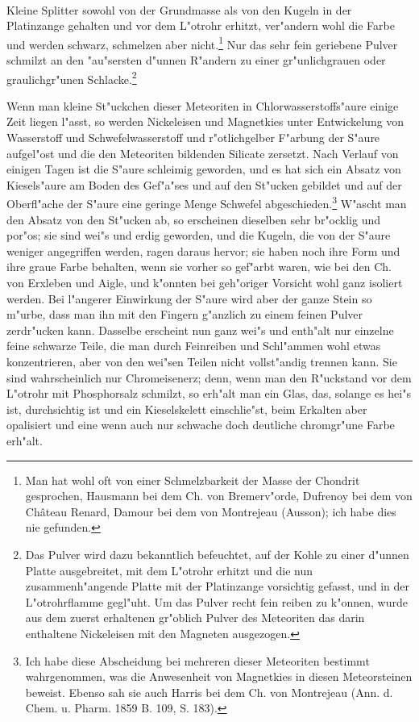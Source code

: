\documentclass[a4paper, 11pt, oneside]{article}
\begin{document}
\paragraph{}
Kleine Splitter sowohl von der Grundmasse als von den Kugeln in der Platinzange gehalten und vor dem L"otrohr erhitzt, ver"andern wohl die Farbe und werden schwarz, schmelzen aber nicht.\footnote{Man hat wohl oft von einer Schmelzbarkeit der Masse der Chondrit gesprochen, Hausmann bei dem Ch. von Bremerv"orde, Dufrenoy bei dem von Château Renard, Damour bei dem von Montrejeau (Ausson); ich habe dies nie gefunden.} Nur das sehr fein geriebene Pulver schmilzt an den "au"sersten d"unnen R"andern zu einer gr"unlichgrauen oder graulichgr"unen Schlacke.\footnote{Das Pulver wird dazu bekanntlich befeuchtet, auf der Kohle zu einer d"unnen Platte ausgebreitet, mit dem L"otrohr erhitzt und die nun zusammenh"angende Platte mit der Platinzange vorsichtig gefasst, und in der L"otrohrflamme gegl"uht. Um das Pulver recht fein reiben zu k"onnen, wurde aus dem zuerst erhaltenen gr"oblich Pulver des Meteoriten das darin enthaltene Nickeleisen mit den Magneten ausgezogen.}

Wenn man kleine St"uckchen dieser Meteoriten in Chlorwasserstoffs"aure einige Zeit liegen l"asst, so werden Nickeleisen und Magnetkies unter Entwickelung von Wasserstoff und Schwefelwasserstoff und r"otlichgelber F"arbung der S"aure aufgel"ost und die den Meteoriten bildenden Silicate zersetzt. Nach Verlauf von einigen Tagen ist die S"aure schleimig geworden, und es hat sich ein Absatz von Kiesels"aure am Boden des Gef"a"ses und auf den St"ucken gebildet und auf der Oberfl"ache der S"aure eine geringe Menge Schwefel abgeschieden.\footnote{Ich habe diese Abscheidung bei mehreren dieser Meteoriten bestimmt wahrgenommen, was die Anwesenheit von Magnetkies in diesen Meteorsteinen beweist. Ebenso sah sie auch Harris bei dem Ch. von Montrejeau (Ann. d. Chem. u. Pharm. 1859 B. 109, S. 183).} W"ascht man den Absatz von den St"ucken ab, so erscheinen dieselben sehr br"ocklig und por"os; sie sind wei"s und erdig geworden, und die Kugeln, die von der S"aure weniger angegriffen werden, ragen daraus hervor; sie haben noch ihre Form und ihre graue Farbe behalten, wenn sie vorher so gef"arbt waren, wie bei den Ch. von Erxleben und Aigle, und k"onnten bei geh"origer Vorsicht wohl ganz isoliert werden. Bei l"angerer Einwirkung der S"aure wird aber der ganze Stein so m"urbe, dass man ihn mit den Fingern g"anzlich zu einem feinen Pulver zerdr"ucken kann. Dasselbe erscheint nun ganz wei"s und enth"alt nur einzelne feine schwarze Teile, die man durch Feinreiben und Schl"ammen wohl etwas konzentrieren, aber von den wei"sen Teilen nicht vollst"andig trennen kann. Sie sind wahrscheinlich nur Chromeisenerz; denn, wenn man den R"uckstand vor dem L"otrohr mit Phosphorsalz schmilzt, so erh"alt man ein Glas, das, solange es hei"s ist, durchsichtig ist und ein Kieselskelett einschlie"st, beim Erkalten aber opalisiert und eine wenn auch nur schwache doch deutliche chromgr"une Farbe erh"alt.
\end{document}
